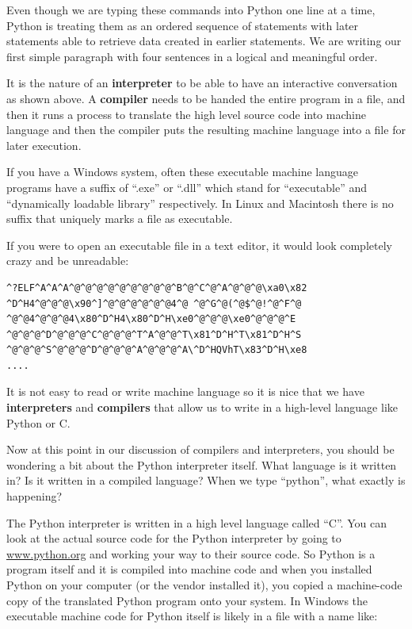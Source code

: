 Even though we are typing these commands into Python one line at a time, Python
is treating them as an ordered sequence of statements with later statements able
to retrieve data created in earlier statements.   We are writing our first 
simple paragraph with four sentences in a logical and meaningful order.

It is the nature of an {\bf interpreter} to be able to have an interactive conversation
as shown above.  A {\bf compiler} needs to be handed the entire program in a file, and then 
it runs a process to translate the high level source code into machine language
and then the compiler puts the resulting machine language into a file for later
execution.

If you have a Windows system, often these executable machine language programs have a
suffix of ``.exe'' or ``.dll'' which stand for ``executable'' and ``dynamically loadable
library'' respectively.  In Linux and Macintosh there is no suffix that uniquely marks
a file as executable.

If you were to open an executable file in a text editor, it would look 
completely crazy and be unreadable:

\beforeverb
\begin{verbatim}
^?ELF^A^A^A^@^@^@^@^@^@^@^@^@^B^@^C^@^A^@^@^@\xa0\x82
^D^H4^@^@^@\x90^]^@^@^@^@^@^@4^@ ^@^G^@(^@$^@!^@^F^@
^@^@4^@^@^@4\x80^D^H4\x80^D^H\xe0^@^@^@\xe0^@^@^@^E
^@^@^@^D^@^@^@^C^@^@^@^T^A^@^@^T\x81^D^H^T\x81^D^H^S
^@^@^@^S^@^@^@^D^@^@^@^A^@^@^@^A\^D^HQVhT\x83^D^H\xe8
....
\end{verbatim}
\afterverb
%
It is not easy to read or write machine language so it is nice that we have
{\bf interpreters} and {\bf compilers} that allow us to write in a high-level
language like Python or C.

Now at this point in our discussion of compilers and interpreters, you should 
be wondering a bit about the Python interpreter itself.  What language is 
it written in?  Is it written in a compiled language?  When we type
``python'', what exactly is happening?

The Python interpreter is written in a high level language called ``C''.  
You can look at the actual source code for the Python interpreter by
going to \url{www.python.org} and working your way to their source code.
So Python is a program itself and it is compiled into machine code and
when you installed Python on your computer (or the vendor installed it),
you copied a machine-code copy of the translated Python program onto your
system.   In Windows the executable machine code for Python itself is likely
in a file with a name like:

